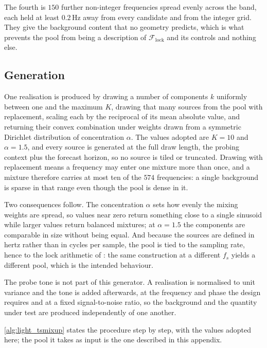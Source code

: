 The fourth is $150$ further non-integer frequencies spread evenly across the band, each held at least $0.2$\,Hz away from every candidate and from the integer grid. They give the background content that no geometry predicts, which is what prevents the pool from being a description of $\mathcal F_{\mathrm{lock}}$ and its controls and nothing else.

\subsection{Generation}

One realisation is produced by drawing a number of components $k$ uniformly between one and the maximum $K$, drawing that many sources from the pool with replacement, scaling each by the reciprocal of its mean absolute value, and returning their convex combination under weights drawn from a symmetric Dirichlet distribution of concentration $\alpha$. The values adopted are $K=10$ and $\alpha=1.5$, and every source is generated at the full draw length, the probing context plus the forecast horizon, so no source is tiled or truncated. Drawing with replacement means a frequency may enter one mixture more than once, and a mixture therefore carries at most ten of the $574$ frequencies: a single background is sparse in that range even though the pool is dense in it.

Two consequences follow. The concentration $\alpha$ sets how evenly the mixing weights are spread, so values near zero return something close to a single sinusoid while larger values return balanced mixtures; at $\alpha=1.5$ the components are comparable in size without being equal. And because the sources are defined in hertz rather than in cycles per sample, the pool is tied to the sampling rate, hence to the lock arithmetic of : the same construction at a different $f_s$ yields a different pool, which is the intended behaviour.

The probe tone is not part of this generator. A realisation is normalised to unit variance and the tone is added afterwards, at the frequency and phase the design requires and at a fixed signal-to-noise ratio, so the background and the quantity under test are produced independently of one another.

\autoref{alg:light_tsmixup} states the procedure step by step, with the values adopted here; the pool it takes as input is the one described in this appendix.